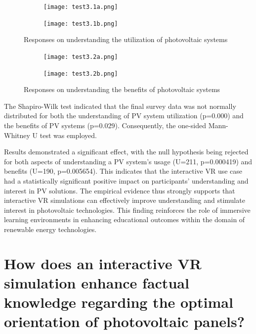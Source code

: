 \documentclass[draft, final]{vutinfth} %
\begin{document}
\begin{figure}[h]
  \centering
  \begin{subfigure}[b]{\textwidth}
    \texttt{[image: test3.1a.png]}
    \label{fig:preliminary-survey-use}
  \end{subfigure}
  
  \begin{subfigure}[b]{\textwidth}
    \texttt{[image: test3.1b.png]}
    \label{fig:final-survey-use}
  \end{subfigure}
  
  \caption{Responses on understanding the utilization of photovoltaic systems}
  \label{fig:combined-survey-use}
\end{figure}

\begin{figure}[h]
  \centering
  \begin{subfigure}[b]{\textwidth}
    \texttt{[image: test3.2a.png]}
    \label{fig:preliminary-survey-benefits}
  \end{subfigure}
  
  \begin{subfigure}[b]{\textwidth}
    \texttt{[image: test3.2b.png]}
    \label{fig:final-survey-benefits}
  \end{subfigure}
  
  \caption{Responses on understanding the benefits of photovoltaic systems}
  \label{fig:combined-survey-benefits}
\end{figure}

The Shapiro-Wilk test indicated that the final survey data was not normally distributed for both the understanding of PV system utilization (p=0.000) and the benefits of PV systems (p=0.029). Consequently, the one-sided Mann-Whitney U test was employed.

Results demonstrated a significant effect, with the null hypothesis being rejected for both aspects of understanding a PV system's usage (U=211, p=0.000419) and benefits (U=190, p=0.005654). This indicates that the interactive VR use case had a statistically significant positive impact on participants' understanding and interest in PV solutions. The empirical evidence thus strongly supports that interactive VR simulations can effectively improve understanding and stimulate interest in photovoltaic technologies. This finding reinforces the role of immersive learning environments in enhancing educational outcomes within the domain of renewable energy technologies.

\section{How does an interactive VR simulation enhance factual knowledge regarding the optimal orientation of photovoltaic panels?}
\end{document}

